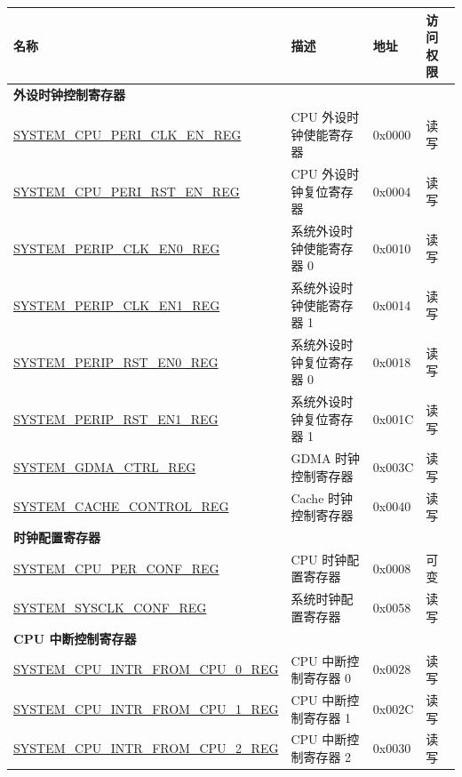 \begin{longtable}{ | p{6.5cm} | p{5.5cm} | p{1.3cm} | p{2cm} | }
\hline\rowcolor{lightgray}
\textbf{名称} & \textbf{描述} & \textbf{地址} & \textbf{访问权限}  \\ \hline
\endhead
\multicolumn{4}{|l|}{\textbf{外设时钟控制寄存器}} \\ \hline
\hyperref[regdesc:SYSTEMCPUPERICLKENREG]{SYSTEM\_CPU\_PERI\_CLK\_EN\_REG} & CPU 外设时钟使能寄存器 & 0x0000 & 读写 \\ \hline
\hyperref[regdesc:SYSTEMCPUPERIRSTENREG]{SYSTEM\_CPU\_PERI\_RST\_EN\_REG} & CPU 外设时钟复位寄存器 & 0x0004 & 读写 \\ \hline
\hyperref[regdesc:SYSTEMPERIPCLKEN0REG]{SYSTEM\_PERIP\_CLK\_EN0\_REG} & 系统外设时钟使能寄存器 0 & 0x0010 & 读写 \\ \hline
\hyperref[regdesc:SYSTEMPERIPCLKEN1REG]{SYSTEM\_PERIP\_CLK\_EN1\_REG} & 系统外设时钟使能寄存器 1 & 0x0014 & 读写 \\ \hline
\hyperref[regdesc:SYSTEMPERIPRSTEN0REG]{SYSTEM\_PERIP\_RST\_EN0\_REG} & 系统外设时钟复位寄存器 0 & 0x0018 & 读写 \\ \hline
\hyperref[regdesc:SYSTEMPERIPRSTEN1REG]{SYSTEM\_PERIP\_RST\_EN1\_REG} & 系统外设时钟复位寄存器 1 & 0x001C & 读写 \\ \hline
\hyperref[regdesc:SYSTEMGDMACTRLREG]{SYSTEM\_GDMA\_CTRL\_REG} & GDMA 时钟控制寄存器 & 0x003C & 读写 \\ \hline
\hyperref[regdesc:SYSTEMCACHECONTROLREG]{SYSTEM\_CACHE\_CONTROL\_REG} & Cache 时钟控制寄存器 & 0x0040 & 读写 \\ \hline
\multicolumn{4}{|l|}{\textbf{时钟配置寄存器}} \\ \hline
\hyperref[regdesc:SYSTEMCPUPERCONFREG]{SYSTEM\_CPU\_PER\_CONF\_REG} & CPU 时钟配置寄存器 & 0x0008 & 可变 \\ \hline
\hyperref[regdesc:SYSTEMSYSCLKCONFREG]{SYSTEM\_SYSCLK\_CONF\_REG} & 系统时钟配置寄存器 & 0x0058 & 读写 \\ \hline
\multicolumn{4}{|l|}{\textbf{CPU 中断控制寄存器}} \\ \hline
\hyperref[regdesc:SYSTEMCPUINTRFROMCPU0REG]{SYSTEM\_CPU\_INTR\_FROM\_CPU\_0\_REG} & CPU 中断控制寄存器 0 & 0x0028 & 读写 \\ \hline
\hyperref[regdesc:SYSTEMCPUINTRFROMCPU1REG]{SYSTEM\_CPU\_INTR\_FROM\_CPU\_1\_REG} & CPU 中断控制寄存器 1 & 0x002C & 读写 \\ \hline
\hyperref[regdesc:SYSTEMCPUINTRFROMCPU2REG]{SYSTEM\_CPU\_INTR\_FROM\_CPU\_2\_REG} & CPU 中断控制寄存器 2 & 0x0030 & 读写 \\ \hline

\end{longtable}

